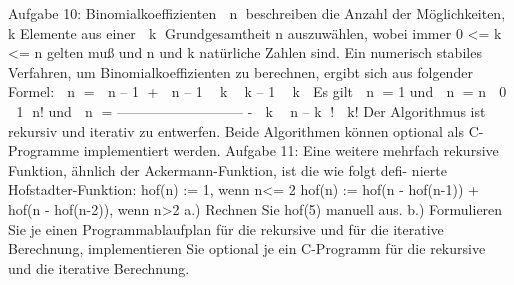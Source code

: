 Aufgabe 10:
Binomialkoeffizienten  n beschreiben die Anzahl der Möglichkeiten, k Elemente aus einer
 k
Grundgesamtheit n auszuwählen, wobei immer 0 <= k <= n gelten muß und n und k natürliche
Zahlen sind. Ein numerisch stabiles Verfahren, um Binomialkoeffizienten zu berechnen, ergibt
sich aus folgender Formel:  n
=  n – 1 +  n – 1
 k
 k – 1  k 
Es gilt  n = 1 und  n = n
 0
 1
n!
und  n = ---------------------------
-
 k
 n – k !  k!
Der Algorithmus ist rekursiv und iterativ zu entwerfen. Beide Algorithmen können optional
als C-Programme implementiert werden.
Aufgabe 11: Eine weitere mehrfach rekursive Funktion, ähnlich der Ackermann-Funktion, ist die wie folgt defi-
nierte Hofstadter-Funktion:
hof(n) := 1, wenn n<= 2
hof(n) := hof(n - hof(n-1)) + hof(n - hof(n-2)), wenn n>2
a.) Rechnen Sie hof(5) manuell aus.
b.) Formulieren Sie je einen Programmablaufplan für die rekursive und für die iterative Berechnung,
implementieren Sie optional je ein C-Programm für die rekursive und die iterative Berechnung.
